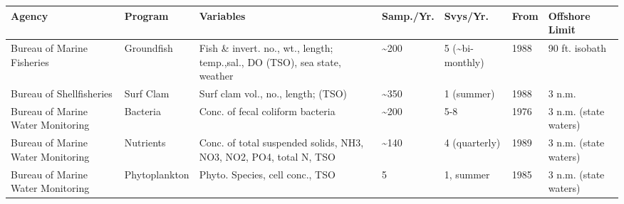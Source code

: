 \begin{center}
  \begin{tabular}[t]{|p{.75in}|p{0.5in}|p{1.0in}|p{0.5in}|p{0.5in}|p{0.5in}|p{0.75in}|} \hline
\textbf{Agency} & \textbf{Program} & \textbf{Variables} & \textbf{Samp.\-/Yr.} & \textbf{Svys\-/Yr.} & \textbf{From} & \textbf{Offshore Limit} \\ \hline
Bureau of Marine Fisheries & 
Ground\-fish      & 
Fish \& invert. no., wt., length; temp.,sal., DO (TSO), sea state, weather &
\~{}200 &
5 (\~{}bi-monthly)&
1988 &  
90 ft. isobath \\ \hline
Bureau of Shellfisheries &
Surf Clam &
Surf clam vol., no., length; (TSO) &
\~{}350 &
1 (summer) & 
1988 & 
3 n.m. \\ \hline
Bureau of Marine Water Monitoring &
Bacteria &           
Conc. of fecal coliform bacteria &
\~{}200 &
5-8 &
1976 &
3 n.m. (state waters) \\ \hline
Bureau of Marine Water Monitoring &
Nutrients &
Conc. of total suspended solids, NH3, NO3, NO2, PO4, total N, TSO &
\~{}140 &
4 (quarterly) &
1989 &
3 n.m. (state waters) \\ \hline
Bureau of Marine Water Monitoring &
Phyto\-plankton &
Phyto. Species, cell conc., TSO &
5 &
1, summer &
1985 &
3 n.m. (state waters) \\ \hline
  \end{tabular}
\end{center}



